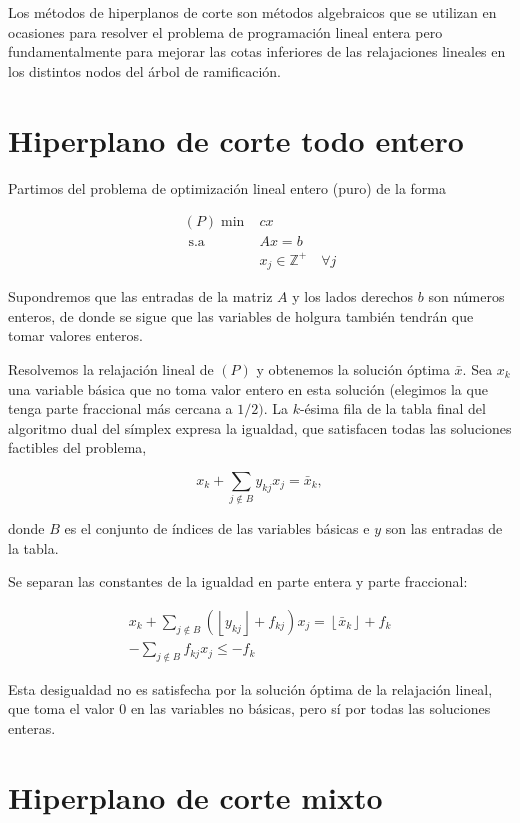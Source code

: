 \documentclass[openany]{book}
\begin{document}
Los métodos de hiperplanos de corte son métodos algebraicos que se utilizan en ocasiones para resolver el problema de programación lineal entera pero fundamentalmente para mejorar las cotas inferiores de las relajaciones lineales en los distintos nodos del árbol de ramificación.

\section{Hiperplano de corte todo entero}

Partimos del problema de optimización lineal entero (puro) de la forma

$$
\begin{aligned}
(P) \min & c x \\
\text { s.a } & A x=b \\
& x_{j} \in \mathbb{Z}^{+} \quad \forall j
\end{aligned}
$$

Supondremos que las entradas de la matriz $A$ y los lados derechos $b$ son números enteros, de donde se sigue que las variables de holgura también tendrán que tomar valores enteros.

Resolvemos la relajación lineal de $(P)$ y obtenemos la solución óptima $\bar{x}$. Sea $x_{k}$ una variable básica que no toma valor entero en esta solución (elegimos la que tenga parte fraccional más cercana a $1 / 2)$. La $k$-ésima fila de la tabla final del algoritmo dual del símplex expresa la igualdad, que satisfacen todas las soluciones factibles del problema,

$$
x_{k}+\sum_{j \notin B} y_{k j} x_{j}=\bar{x}_{k},
$$

donde $B$ es el conjunto de índices de las variables básicas e $y$ son las entradas de la tabla.

Se separan las constantes de la igualdad en parte entera y parte fraccional:

$$
\begin{gathered}
x_{k}+\sum_{j \notin B}\left(\left\lfloor y_{k j}\right\rfloor+f_{k j}\right) x_{j}=\left\lfloor\bar{x}_{k}\right\rfloor+f_{k} \\
-\sum_{j \notin B} f_{k j} x_{j} \leq-f_{k}
\end{gathered}
$$

Esta desigualdad no es satisfecha por la solución óptima de la relajación lineal, que toma el valor 0 en las variables no básicas, pero sí por todas las soluciones enteras.

\section{Hiperplano de corte mixto}
\end{document}
